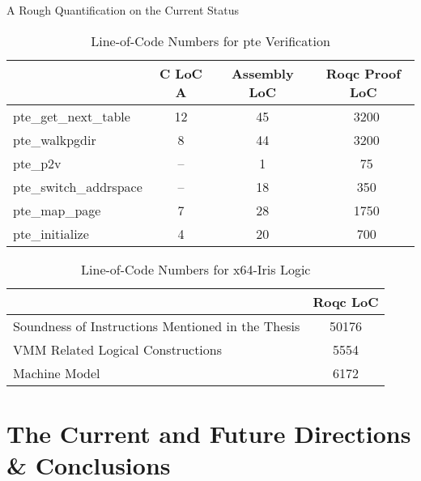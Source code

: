 \documentclass[aspectratio=169,xcolor=dvipsnames]{beamer}
\begin{document}
\begin{frame}{A Rough Quantification on the Current Status}\scriptsize
    \begin{table}[ht]
\centering
\caption{Line-of-Code Numbers for \textsf{pte} Verification}
\label{fig:tablepte}
\begin{tabular}[t]{lccc}
\hline
& C LoC A& Assembly LoC & Roqc Proof LoC \\
\hline
pte\_get\_next\_table&12&45& ~3200\\
pte\_walkpgdir&8&44& ~3200\\
pte\_p2v&--&1&~75\\
pte\_switch\_addrspace&--&18&~350\\
pte\_map\_page&7&28&~1750\\
pte\_initialize&4&20&~700\\
\hline
\end{tabular}
\end{table}%
\begin{table}[ht]
\centering
\caption{Line-of-Code Numbers for x64-Iris Logic}
\label{fig:tablex64iris}
\begin{tabular}[t]{lc}
\hline
& Roqc LoC  \\
\hline
Soundness of Instructions Mentioned in the Thesis &50176\\
VMM Related Logical Constructions &5554\\
Machine Model & 6172\\
\hline
\end{tabular}
\end{table}%

\end{frame}
\section{The Current and Future Directions \& Conclusions}
\end{document}
